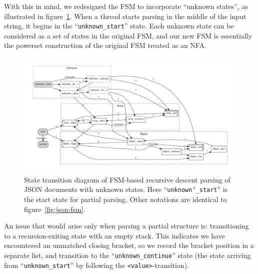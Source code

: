 \documentclass[11pt]{article}
\begin{document}
With this in mind, we redesigned the FSM to incorporate ``unknown states'', as illustrated in figure~\ref{fig:json-fsm-nfa}. When a thread starts parsing in the middle of the input string, it begins in the ``\verb|unknown_start|'' state. Each unknown state can be considered as a set of states in the original FSM, and our new FSM is essentially the powerset construction of the original FSM treated as an NFA.

\begin{figure}
  \includegraphics[width=\linewidth]{figures/json_fsm_nfa.pdf}
  \caption{State transition diagram of FSM-based recursive descent parsing of JSON documents with unknown states. Here ``\texttt{unknown\char`_start}'' is the start state for partial parsing. Other notations are identical to figure~\ref{fig:json-fsm}.}
  \label{fig:json-fsm-nfa}
\end{figure}

An issue that would arise only when parsing a partial structure is: transitioning to a recursion-exiting state with an empty stack. This indicates we have encountered an unmatched closing bracket, so we record the bracket position in a separate list, and transition to the ``\verb|unknown_continue|'' state (the state arriving from ``\verb|unknown_start|'' by following the \verb|<value>|-transition).
\end{document}
